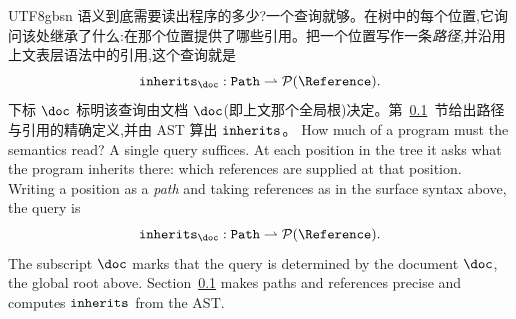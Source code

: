\begin{CJK*}{UTF8}{gbsn}
\ifPaperChinese
语义到底需要读出程序的多少?一个查询就够。在树中的每个位置,它询问该处继承了什么:在那个位置提供了哪些引用。把一个位置写作一条\emph{路径},并沿用上文表层语法中的引用,这个查询就是
\begin{equation}\label{eq:primitives}
  \inherits_{\doc} : \Path \rightharpoonup \mathcal{P}(\Reference).
\end{equation}
下标 $\doc$ 标明该查询由文档 $\doc$(即上文那个全局根)决定。第~\ref{sec:syntactic-helpers}~节给出路径与引用的精确定义,并由 AST 算出 $\mathtt{inherits}$。
\else
How much of a program must the semantics read? A single query
suffices. At each position in the tree it asks what the program
inherits there: which references are supplied at that position.
Writing a position as a \emph{path} and taking references as in the
surface syntax above, the query is
\begin{equation}\label{eq:primitives}
  \inherits_{\doc} : \Path \rightharpoonup \mathcal{P}(\Reference).
\end{equation}
The subscript $\doc$ marks that the query is determined by the document $\doc$, the
global root above. Section~\ref{sec:syntactic-helpers} makes paths and references precise and
computes $\mathtt{inherits}$ from the AST.
\fi

\subsection{}
\label{sec:syntactic-helpers}


\end{CJK*}
